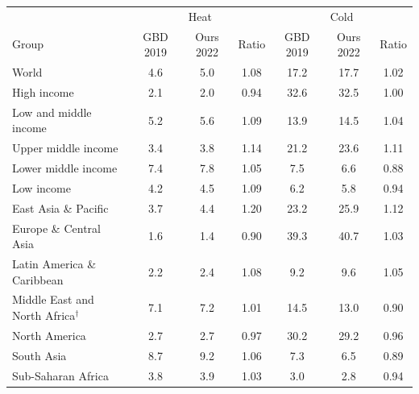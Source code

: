 \begin{tabular}{lcccccc}
\toprule
& \multicolumn{3}{c}{Heat} & \multicolumn{3}{c}{Cold} \\ Group & GBD 2019 & Ours 2022 & Ratio & GBD 2019 & Ours 2022 & Ratio \\
\midrule
World & 4.6 & 5.0 & 1.08 & 17.2 & 17.7 & 1.02 \\ \addlinespace
High income & 2.1 & 2.0 & 0.94 & 32.6 & 32.5 & 1.00 \\
Low and middle income & 5.2 & 5.6 & 1.09 & 13.9 & 14.5 & 1.04 \\
Upper middle income & 3.4 & 3.8 & 1.14 & 21.2 & 23.6 & 1.11 \\
Lower middle income & 7.4 & 7.8 & 1.05 & 7.5 & 6.6 & 0.88 \\
Low income & 4.2 & 4.5 & 1.09 & 6.2 & 5.8 & 0.94 \\ \addlinespace
East Asia \& Pacific & 3.7 & 4.4 & 1.20 & 23.2 & 25.9 & 1.12 \\
Europe \& Central Asia & 1.6 & 1.4 & 0.90 & 39.3 & 40.7 & 1.03 \\
Latin America \& Caribbean & 2.2 & 2.4 & 1.08 & 9.2 & 9.6 & 1.05 \\
Middle East and North Africa$^{\dagger}$ & 7.1 & 7.2 & 1.01 & 14.5 & 13.0 & 0.90 \\
North America & 2.7 & 2.7 & 0.97 & 30.2 & 29.2 & 0.96 \\
South Asia & 8.7 & 9.2 & 1.06 & 7.3 & 6.5 & 0.89 \\
Sub-Saharan Africa & 3.8 & 3.9 & 1.03 & 3.0 & 2.8 & 0.94 \\
\bottomrule
\end{tabular}

